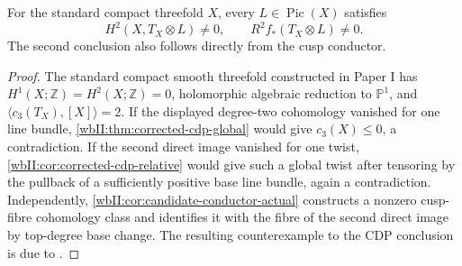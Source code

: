 \begin{corollary}
\hypertarget{tag-03IV}{}\label{wbII:test:cdp-comparison}

For the standard compact threefold $X$, every $L\in\operatorname{Pic}(X)$
satisfies
\[
 H^2(X,T_X\otimes L)\ne0,
 \qquad R^2f_*(T_X\otimes L)\ne0.
\]
The second conclusion also follows directly from the cusp conductor.
\end{corollary}


\begin{proof}
The standard compact smooth threefold constructed in Paper I has
$H^1(X;\mathbb Z)=H^2(X;\mathbb Z)=0$, holomorphic algebraic reduction
to $\mathbb P^1$, and $\langle c_3(T_X),[X]\rangle=2$.
If the displayed degree-two cohomology vanished for one line bundle,
\cref{wbII:thm:corrected-cdp-global} would give $c_3(X)\le0$, a contradiction.
If the second direct image vanished for one twist,
\cref{wbII:cor:corrected-cdp-relative} would give such a global twist after
tensoring by the pullback of a sufficiently positive base line bundle,
again a contradiction. Independently,
\cref{wbII:cor:candidate-conductor-actual} constructs a nonzero cusp-fibre
cohomology class and identifies it with the fibre of the second direct
image by top-degree base change. The resulting counterexample to the CDP conclusion is due to \citet[Section~10.3, Theorem~10.5 and Corollary~10.6, pp.~88--89]{AC2026}.

\end{proof}